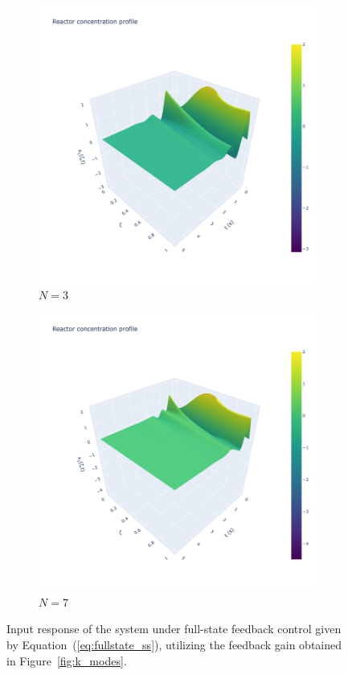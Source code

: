 \begin{figure}[!htbp]
    \centering
    \begin{subfigure}[b]{0.45\textwidth}
        \includegraphics[width=\textwidth,trim=0 0 100 0,clip]{Figures/3D_x1_k3.png}
        \caption{$N=3$}
        \label{fig:3D_x1_k3}
    \end{subfigure}
    \hfill
    \begin{subfigure}[b]{0.45\textwidth}
        \includegraphics[width=\textwidth,trim=0 0 100 0,clip]{Figures/3D_x1_k7.png}
        \caption{$N=7$}
        \label{fig:3D_x1_k7}
    \end{subfigure}
    \caption{Input response of the system under full-state feedback control given by Equation~(\ref{eq:fullstate_ss}), utilizing the feedback gain obtained in Figure~\ref{fig:k_modes}.}
    \label{fig:full_state_feedback}
\end{figure}

